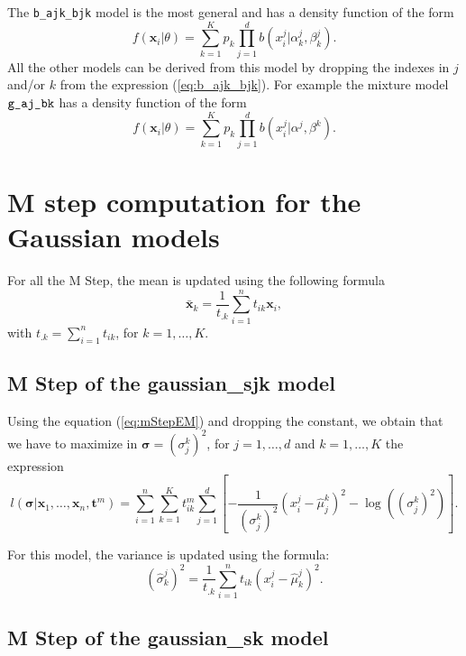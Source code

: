 \documentclass[a4paper,10pt]{article}
\newcommand{\bx}{\mathbf{x}}
\newcommand{\bt}{\mathbf{t}}
\newcommand{\bsigma}{\boldsymbol{\sigma}}
\begin{document}
The \verb+b_ajk_bjk+ model is the most general and has a density function of the form
\begin{equation}\label{eq:b_ajk_bjk}
  f({\bx}_i|\theta) = \sum_{k=1}^K p_k \prod_{j=1}^d b(x^j_{i}| \alpha^j_{k},\beta^j_{k}).
\end{equation}
All the other models can be derived from this model by dropping the indexes in $j$ and/or $k$
from the expression (\ref{eq:b_ajk_bjk}). For example the mixture model $\verb+g_aj_bk+$ has a density
function of the form
\begin{equation}\label{eq:b_aj_bk}
  f({\bx}_i|\theta) = \sum_{k=1}^K p_k \prod_{j=1}^d b(x^j_{i}| \alpha^j,\beta^{k}).
\end{equation}




\appendix

\section{M step computation for the Gaussian models}

For all the M Step, the mean is updated using the following formula
$$
\bar{\bx}_k = \frac{1}{t_{.k}} \sum_{i=1}^n t_{ik} \bx_i,
$$
with $t_{.k} = \sum_{i=1}^n t_{ik}$, for $k=1,\ldots,K$.


\subsection{M Step of the gaussian\_sjk model}

Using the equation (\ref{eq:mStepEM}) and dropping the constant, we obtain that we have to
maximize in $\bsigma = (\sigma_j^k)^2$, for $j=1,\ldots,d$ and $k=1,\ldots,K$ the expression
\begin{equation} \label{eq:gaussian_sjk}
l(\bsigma | {\bx}_{1},\ldots,{\bx}_{n}, {\bt}^m) = \sum_{i=1}^{n} \sum_{k=1}^{K} t_{ik}^m
     \sum_{j=1}^d \left[ - \frac{1}{(\sigma_j^k)^2} (x_i^j - \hat{\mu}_j^k)^2 - \log((\sigma_j^k)^2) \right].
\end{equation}

For this model, the variance is updated using the formula:
$$
(\hat{\sigma}^j_k)^2 = \frac{1}{t_{.k}} \sum_{i=1}^n t_{ik} (x^j_i-\hat{\mu}^j_k)^2.
$$

\subsection{M Step of the gaussian\_sk model}
\end{document}
